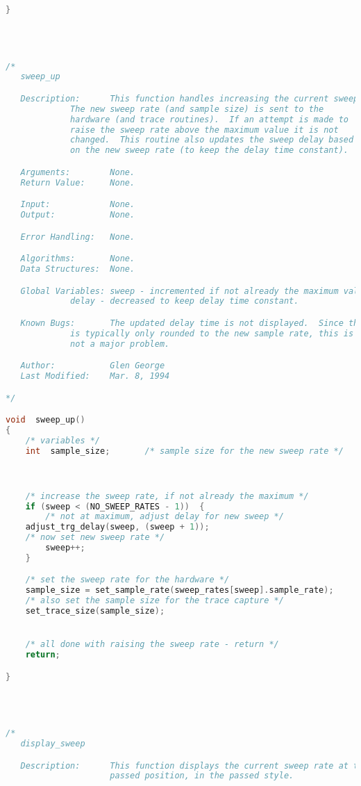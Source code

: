 \begin{lstlisting}[language=C]
}




/*
   sweep_up

   Description:      This function handles increasing the current sweep rate.
   		     The new sweep rate (and sample size) is sent to the
		     hardware (and trace routines).  If an attempt is made to
		     raise the sweep rate above the maximum value it is not
		     changed.  This routine also updates the sweep delay based
		     on the new sweep rate (to keep the delay time constant).

   Arguments:        None.
   Return Value:     None.

   Input:            None.
   Output:           None.

   Error Handling:   None.

   Algorithms:       None.
   Data Structures:  None.

   Global Variables: sweep - incremented if not already the maximum value.
   		     delay - decreased to keep delay time constant.

   Known Bugs:       The updated delay time is not displayed.  Since the time
   		     is typically only rounded to the new sample rate, this is
		     not a major problem.

   Author:           Glen George
   Last Modified:    Mar. 8, 1994

*/

void  sweep_up()
{
    /* variables */
    int  sample_size;		/* sample size for the new sweep rate */



    /* increase the sweep rate, if not already the maximum */
    if (sweep < (NO_SWEEP_RATES - 1))  {
        /* not at maximum, adjust delay for new sweep */
	adjust_trg_delay(sweep, (sweep + 1));
	/* now set new sweep rate */
        sweep++;
    }

    /* set the sweep rate for the hardware */
    sample_size = set_sample_rate(sweep_rates[sweep].sample_rate);
    /* also set the sample size for the trace capture */
    set_trace_size(sample_size);


    /* all done with raising the sweep rate - return */
    return;

}




/*
   display_sweep

   Description:      This function displays the current sweep rate at the
                     passed position, in the passed style.


\end{lstlisting}
